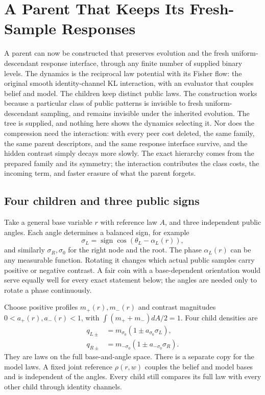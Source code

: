 \chapter{A Parent That Keeps Its Fresh-Sample Responses}
\label{comp:boundary}

A parent can now be constructed that preserves evolution and the fresh uniform-descendant response interface, through any finite number of supplied binary levels. The dynamics is the reciprocal law potential with its Fisher flow: the original smooth identity-channel KL interaction, with an evaluator that couples belief and model. The children keep distinct public laws. The construction works because a particular class of public patterns is invisible to fresh uniform-descendant sampling, and remains invisible under the inherited evolution. The tree is supplied, and nothing here shows the dynamics selecting it. Nor does the compression need the interaction: with every peer cost deleted, the same family, the same parent descriptors, and the same response interface survive, and the hidden contrast simply decays more slowly. The exact hierarchy comes from the prepared family and its symmetry; the interaction contributes the class costs, the incoming term, and faster erasure of what the parent forgets.

\section{Four children and three public signs}

Take a general base variable $r$ with reference law $A$, and three independent public angles. Each angle determines a balanced sign, for example
\begin{equation}
 \sigma_L=\operatorname{sign}\cos(\theta_L-\alpha_L(r)),
\end{equation}
and similarly $\sigma_R,\sigma_0$ for the right node and the root. The phase $\alpha_L(r)$ can be any measurable function. Rotating it changes which actual public samples carry positive or negative contrast. A fair coin with a base-dependent orientation would serve equally well for every exact statement below; the angles are needed only to rotate a phase continuously.

Choose positive profiles $m_+(r),m_-(r)$ and contrast magnitudes $0<a_+(r),a_-(r)<1$, with $\int(m_++m_-)dA/2=1$. Four child densities are
\begin{equation}
 \begin{aligned}
 q_{L\pm}&=m_{\sigma_0}(1\pm a_{\sigma_0}\sigma_L),\\
 q_{R\pm}&=m_{-\sigma_0}(1\pm a_{-\sigma_0}\sigma_R).
 \end{aligned}
 \label{comp:boundary-four}
\end{equation}
They are laws on the full base-and-angle space. There is a separate copy for the model laws. A fixed joint reference $\rho(r,w)$ couples the belief and model bases and is independent of the angles. Every child still compares its full law with every other child through identity channels.

